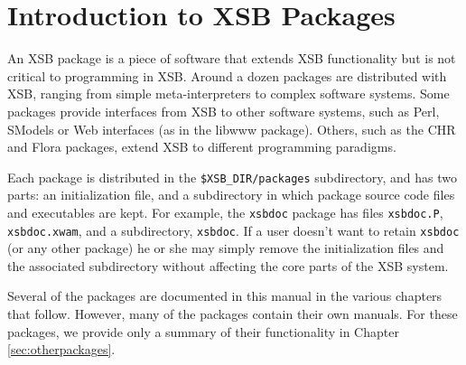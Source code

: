 \chapter{Introduction to XSB Packages} \label{packages}

An XSB package is a piece of software that extends XSB functionality
but is not critical to programming in XSB.  Around a dozen packages
are distributed with XSB, ranging from simple meta-interpreters to
complex software systems.  Some packages provide interfaces from XSB
to other software systems, such as Perl, SModels or Web interfaces (as
in the libwww package).  Others, such as the CHR and Flora packages,
extend XSB to different programming paradigms.

Each package is distributed in the {\tt \$XSB\_DIR/packages}
subdirectory, and has two parts: an initialization file, and a
subdirectory in which package source code files and executables are
kept.  For example, the {\tt xsbdoc} package has files {\tt xsbdoc.P},
{\tt xsbdoc.xwam}, and a subdirectory, {\tt xsbdoc}.  If a user
doesn't want to retain {\tt xsbdoc} (or any other package) he or she
may simply remove the initialization files and the associated
subdirectory without affecting the core parts of the XSB system.

Several of the packages are documented in this manual in the various
chapters that follow.  However, many of the packages contain their own
manuals.  For these packages, we provide only a summary of their
functionality in Chapter \ref{sec:otherpackages}.

